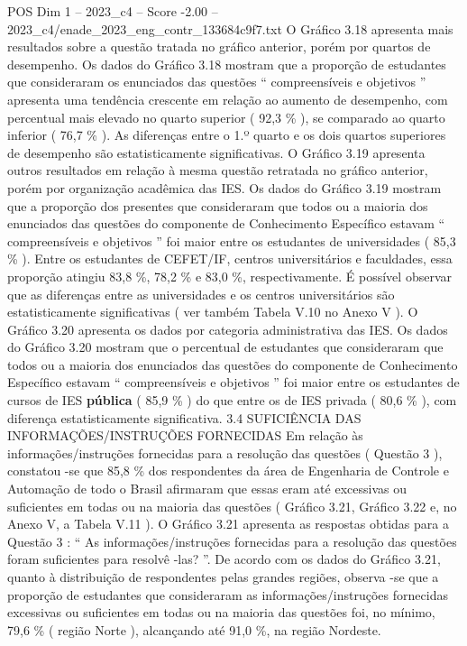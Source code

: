 \begin{textsample}{POS Dim 1 – 2023\_c4 – Score -2.00 – 2023\_c4/enade\_2023\_eng\_contr\_133684c9f7.txt}
O Gráfico 3.18 apresenta mais resultados sobre a questão tratada no gráfico anterior, porém por quartos de desempenho.
Os dados do Gráfico 3.18 mostram que a proporção de estudantes que consideraram os enunciados das questões “ compreensíveis e objetivos ” apresenta uma tendência crescente em relação ao aumento de desempenho, com percentual mais elevado no quarto superior ( 92,3 \% ), se comparado ao quarto inferior ( 76,7 \% ).
As diferenças entre o 1.º quarto e os dois quartos superiores de desempenho são estatisticamente significativas.
O Gráfico 3.19 apresenta outros resultados em relação à mesma questão retratada no gráfico anterior, porém por organização acadêmica das IES.
Os dados do Gráfico 3.19 mostram que a proporção dos presentes que consideraram que todos ou a maioria dos enunciados das questões do componente de Conhecimento Específico estavam “ compreensíveis e objetivos ” foi maior entre os estudantes de universidades ( 85,3 \% ).
Entre os estudantes de CEFET/IF, centros universitários e faculdades, essa proporção atingiu 83,8 \%, 78,2 \% e 83,0 \%, respectivamente.
É possível observar que as diferenças entre as universidades e os centros universitários são estatisticamente significativas ( ver também Tabela V.10 no Anexo V ).
O Gráfico 3.20 apresenta os dados por categoria administrativa das IES.
Os dados do Gráfico 3.20 mostram que o percentual de estudantes que consideraram que todos ou a maioria dos enunciados das questões do componente de Conhecimento Específico estavam “ compreensíveis e objetivos ” foi maior entre os estudantes de cursos de IES \textbf{pública} ( 85,9 \% ) do que entre os de IES privada ( 80,6 \% ), com diferença estatisticamente significativa. 3.4 SUFICIÊNCIA DAS INFORMAÇÕES/INSTRUÇÕES FORNECIDAS Em relação às informações/instruções fornecidas para a resolução das questões ( Questão 3 ), constatou -se que 85,8 \% dos respondentes da área de Engenharia de Controle e Automação de todo o Brasil afirmaram que essas eram até excessivas ou suficientes em todas ou na maioria das questões ( Gráfico 3.21, Gráfico 3.22 e, no Anexo V, a Tabela V.11 ).
O Gráfico 3.21 apresenta as respostas obtidas para a Questão 3 : “ As informações/instruções fornecidas para a resolução das questões foram suficientes para resolvê -las? ”.
De acordo com os dados do Gráfico 3.21, quanto à distribuição de respondentes pelas grandes regiões, observa -se que a proporção de estudantes que consideraram as informações/instruções fornecidas excessivas ou suficientes em todas ou na maioria das questões foi, no mínimo, 79,6 \% ( região Norte ), alcançando até 91,0 \%, na região Nordeste.

\end{textsample}

